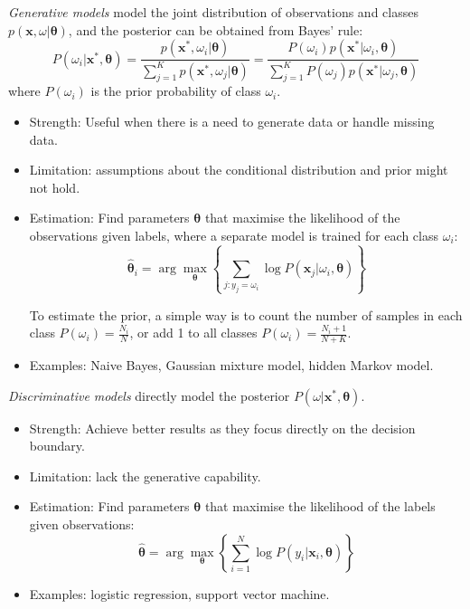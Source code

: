 \documentclass[12pt]{article}
\begin{document}
\textit{Generative models} model the joint distribution of observations and classes $p(\boldsymbol{x}, \omega | \boldsymbol{\theta})$, and the posterior can be obtained from Bayes' rule:
$$
P(\omega_i | \boldsymbol{x^*}, \boldsymbol{\theta}) = \frac{p(\boldsymbol{x^*}, \omega_i | \boldsymbol{\theta})}{\sum_{j=1}^K p(\boldsymbol{x^*}, \omega_j | \boldsymbol{\theta})} = \frac{P(\omega_i) p(\boldsymbol{x^*} | \omega_i, \boldsymbol{\theta})}{\sum_{j=1}^K P(\omega_j) p(\boldsymbol{x^*} | \omega_j, \boldsymbol{\theta})}
$$
where $P(\omega_i)$ is the prior probability of class $\omega_i$. 
\begin{itemize}
    \item Strength: Useful when there is a need to generate data or handle missing data.
    \item Limitation: assumptions about the conditional distribution and prior might not hold.
    \item Estimation: Find parameters $\boldsymbol{\theta}$ that maximise the likelihood of the observations given labels, where a separate model is trained for each class $\omega_i$:
$$
\hat{\boldsymbol{\theta}}_i = \arg\max_{\boldsymbol{\theta}} \left\{\sum_{j:y_j = \omega_i} 
\log P(\boldsymbol{x}_j | \omega_i, \boldsymbol{\theta})\right\}
$$

To estimate the prior, a simple way is to count the number of samples in each class $P(\omega_i) = \frac{N_i}{N}$, or add 1 to all classes $P(\omega_i) = \frac{N_i + 1}{N + K}$.

    \item Examples: Naive Bayes, Gaussian mixture model, hidden Markov model.
\end{itemize}

\textit{Discriminative models} directly model the posterior $P(\omega | \boldsymbol{x^*}, \boldsymbol{\theta})$. 
\begin{itemize}
    \item Strength: Achieve better results as they focus directly on the decision boundary.
    \item Limitation: lack the generative capability.
    \item Estimation: Find parameters $\boldsymbol{\theta}$ that maximise the likelihood of the labels given observations:
$$
\hat{\boldsymbol{\theta}} = \arg\max_{\boldsymbol{\theta}} \left\{\sum_{i=1}^N 
\log P(y_i | \boldsymbol{x}_i, \boldsymbol{\theta})\right\}
$$
    \item Examples: logistic regression, support vector machine.
\end{itemize}
\end{document}
